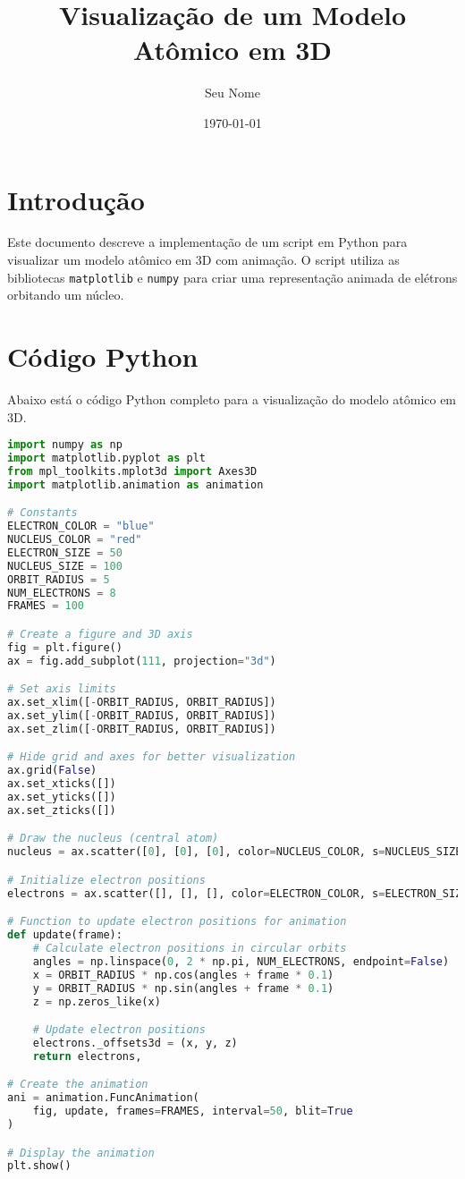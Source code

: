\documentclass{article}
\title{Visualização de um Modelo Atômico em 3D}
\author{Seu Nome}
\date{\today}
\begin{document}
\maketitle

\section{Introdução}
Este documento descreve a implementação de um script em Python para visualizar um modelo atômico em 3D com animação. O script utiliza as bibliotecas \texttt{matplotlib} e \texttt{numpy} para criar uma representação animada de elétrons orbitando um núcleo.

\section{Código Python}
Abaixo está o código Python completo para a visualização do modelo atômico em 3D.

\begin{lstlisting}[language=Python, caption={Script Python para visualização de um modelo atômico em 3D}]
import numpy as np
import matplotlib.pyplot as plt
from mpl_toolkits.mplot3d import Axes3D
import matplotlib.animation as animation

# Constants
ELECTRON_COLOR = "blue"
NUCLEUS_COLOR = "red"
ELECTRON_SIZE = 50
NUCLEUS_SIZE = 100
ORBIT_RADIUS = 5
NUM_ELECTRONS = 8
FRAMES = 100

# Create a figure and 3D axis
fig = plt.figure()
ax = fig.add_subplot(111, projection="3d")

# Set axis limits
ax.set_xlim([-ORBIT_RADIUS, ORBIT_RADIUS])
ax.set_ylim([-ORBIT_RADIUS, ORBIT_RADIUS])
ax.set_zlim([-ORBIT_RADIUS, ORBIT_RADIUS])

# Hide grid and axes for better visualization
ax.grid(False)
ax.set_xticks([])
ax.set_yticks([])
ax.set_zticks([])

# Draw the nucleus (central atom)
nucleus = ax.scatter([0], [0], [0], color=NUCLEUS_COLOR, s=NUCLEUS_SIZE)

# Initialize electron positions
electrons = ax.scatter([], [], [], color=ELECTRON_COLOR, s=ELECTRON_SIZE)

# Function to update electron positions for animation
def update(frame):
    # Calculate electron positions in circular orbits
    angles = np.linspace(0, 2 * np.pi, NUM_ELECTRONS, endpoint=False)
    x = ORBIT_RADIUS * np.cos(angles + frame * 0.1)
    y = ORBIT_RADIUS * np.sin(angles + frame * 0.1)
    z = np.zeros_like(x)

    # Update electron positions
    electrons._offsets3d = (x, y, z)
    return electrons,

# Create the animation
ani = animation.FuncAnimation(
    fig, update, frames=FRAMES, interval=50, blit=True
)

# Display the animation
plt.show()
\end{lstlisting}
\end{document}
